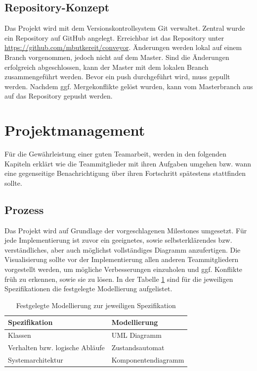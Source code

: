 \documentclass[a4paper, 11pt]{article}
\begin{document}
\newpage

\subsection{Repository-Konzept}
Das Projekt wird mit dem Versionskontrollsystem Git verwaltet. Zentral wurde ein Repository auf GitHub angelegt. Erreichbar ist das Repository unter \url{https://github.com/mbutkereit/conveyor}. Änderungen werden lokal auf einem Branch vorgenommen, jedoch nicht auf dem Master. Sind die Änderungen erfolgreich abgeschlossen, kann der Master mit dem lokalen Branch zusammengeführt werden. Bevor ein push durchgeführt wird, muss gepullt werden. Nachdem ggf. Mergekonflikte gelöst wurden, kann vom Masterbranch aus auf das Repository gepusht werden.

\section{Projektmanagement}
Für die Gewährleistung einer guten Teamarbeit, werden in den folgenden Kapiteln erklärt wie die Teammitglieder mit ihren Aufgaben umgehen bzw. wann eine gegenseitige Benachrichtigung über ihren Fortschritt spätestens stattfinden sollte.

\subsection{Prozess}
Das Projekt wird auf Grundlage der vorgeschlagenen Milestones umgesetzt. Für jede Implementierung ist zuvor ein geeignetes, sowie selbsterklärendes bzw. verständliches, aber auch möglichst vollständiges Diagramm anzufertigen. Die Visualisierung sollte vor der Implementierung allen anderen Teammitgliedern vorgestellt werden, um mögliche Verbesserungen einzuholen und ggf. Konflikte früh zu erkennen, sowie sie zu lösen. In der Tabelle \ref{visuals} sind für die jeweiligen Spezifikationen die festgelegte Modellierung aufgelistet.

\begin{table}[h]
\centering
    \begin{tabularx}{\textwidth}{|l|X|}
    \hline
    \textbf{Spezifikation}&\textbf{Modellierung}\\
    \hline
    Klassen&UML Diagramm\\
    \hline
    Verhalten bzw. logische Abläufe&Zustandsautomat\\
    \hline
    Systemarchitektur&Komponentendiagramm\\
    \hline
    \end{tabularx}
\caption{Festgelegte Modellierung zur jeweiligen Spezifikation}
\label{visuals}
\end{table}
\end{document}
